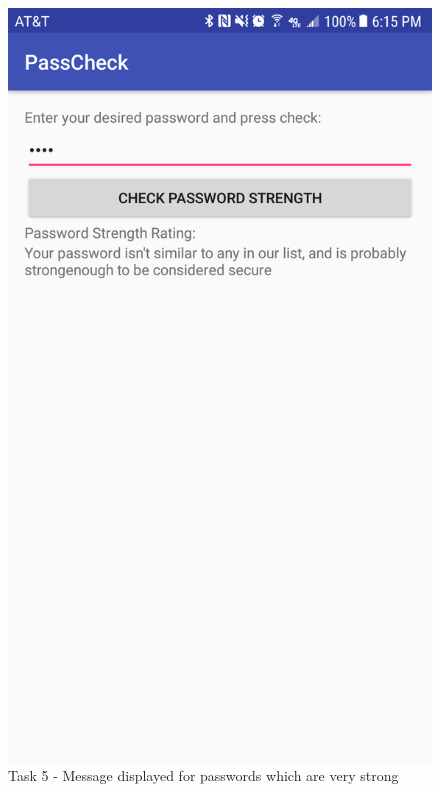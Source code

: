 \documentclass{article}
\makeatletter
\def\maxwidth#1{\ifdim\Gin@nat@width>#1 #1\else\Gin@nat@width\fi}
\makeatother
\begin{document}
	\begin{figure}[ht]
		\includegraphics[width=\maxwidth{3in}]{img/t5s4.png}
		\centering
		\caption{Task 5 - Message displayed for passwords which are very strong}
    \end{figure}
\end{document}
